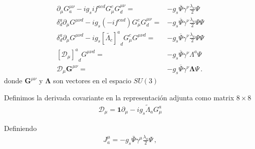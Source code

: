 \begin{align}
\label{eq:Gmuael}
\partial_\mu{G}^{\mu\nu}_a-i g_s i f^{acd}G^c_\mu{G}^{\mu\nu}_d
=&-g_s\overline{\Psi}\gamma^\nu\frac{\lambda_a}{2}\Psi\nonumber\\
\delta^a_d\partial_\mu{G}^{\mu\nu d}-i g_s \left(-i f^{cad}\right)G^c_\mu{G}^{\mu\nu}_d
=&-g_s\overline{\Psi}\gamma^\nu\frac{\lambda_a}{2}\Psi\Psi\nonumber\\
\delta^a_d\partial_\mu{G}^{\mu\nu d}-i g_s {\left[\widetilde{\Lambda_c}\right]^a}_d G^c_\mu{G}^{\mu\nu d}
=&-g_s\overline{\Psi}\gamma^\nu\frac{\lambda_a}{2}\Psi\Psi\nonumber\\
{\left[ \mathcal{D}_\mu \right]^a}_d{G}^{\mu\nu d}
=&-g_s\overline{\Psi}\gamma^\nu\Lambda^{a}\Psi\nonumber\\
\mathcal{D}_\mu{\mathbf{G}}^{\mu\nu}
=&-g_s\overline{\Psi}\gamma^\nu\boldsymbol{\Lambda}\Psi\,.
\end{align}
donde $\mathbf{G}^{\mu\nu}$ y $\boldsymbol{\Lambda}$ son vectores en el espacio $SU(3)$

Definimos la derivada covariante en la representación adjunta como matrix  $8\times8$ 
\begin{align}
  \mathcal{D}_{\mu}=\mathbf{1}\partial_{\mu}-i g_s \widetilde{\Lambda}_a G_{\mu}^{a} 
\end{align}




Definiendo
\begin{align}
J^\mu_a = -g_s\bar{\Psi}\gamma^\mu\frac{\lambda_a}{2}\Psi\,,
\end{align}

